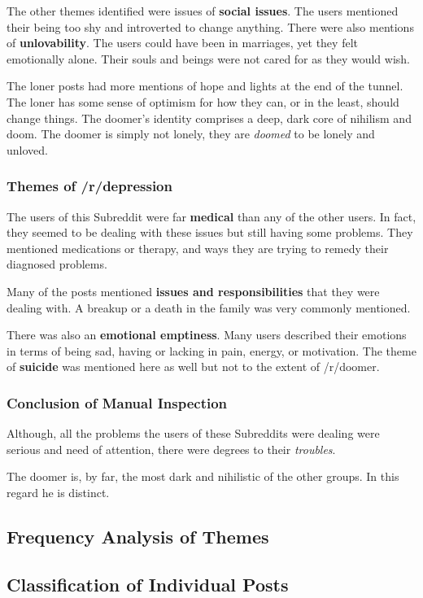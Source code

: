 \documentclass[../report.tex]{subfiles}
\begin{document}
The other themes identified were issues of \textbf{social issues}. The users mentioned their being too shy and introverted to change anything. 
There were also mentions of \textbf{unlovability}.
The users could have been in marriages, yet they felt emotionally alone.
Their souls and beings were not cared for as they would wish.

The loner posts had more mentions of hope and lights at the end of the tunnel. 
The loner has some sense of optimism for how they can, or in the least, should change things.
The doomer's identity comprises a deep, dark core of nihilism and doom.
The doomer is simply not lonely, they are \textit{doomed} to be lonely and unloved. 

\subsubsection{Themes of /r/depression}
The users of this Subreddit were far \textbf{medical} than any of the other users. 
In fact, they seemed to be dealing with these issues but still having some problems. 
They mentioned medications or therapy, and ways they are trying to remedy their diagnosed problems. 

Many of the posts mentioned \textbf{issues and responsibilities} that they were dealing with.
A breakup or a death in the family was very commonly mentioned. 

There was also an \textbf{emotional emptiness}. Many users described their emotions in terms of being sad, having or lacking in pain, energy, or motivation. 
The theme of \textbf{suicide} was mentioned here as well but not to the extent of /r/doomer.

\subsubsection{Conclusion of Manual Inspection}
Although, all the problems the users of these Subreddits were dealing were serious and need of attention, there were degrees to their \textit{troubles}.

The doomer is, by far, the most dark and nihilistic of the other groups. In this regard he is distinct. 

\subsection{Frequency Analysis of Themes}


\subsection{Classification of Individual Posts}

	
\end{document}
